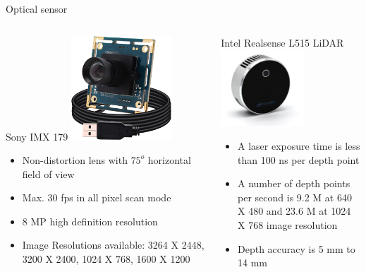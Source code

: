 \documentclass[10pt]{beamer}
\begin{document}
\begin{frame}{Optical sensor}
   \begin{columns}
      \begin{block}{Sony IMX 179}
         \centering
         \includegraphics[width=0.5\textwidth]{Images/imx179.png}
         
        \begin{itemize}
            \item Non-distortion lens with $75^o$ horizontal field of view
            \item Max. 30 fps in all pixel scan mode
            \item 8 MP high definition resolution 
            \item Image Resolutions available: 3264 X 2448, 3200 X 2400, 1024 X 768, 1600 X 1200
        \end{itemize}
      \end{block}
      
      \begin{block}{Intel Realsense L515 LiDAR}
         \centering
         \includegraphics[width=0.6\textwidth]{Images/L515.png}
        
        \begin{itemize}
             \item A laser exposure time is less than 100 ns per depth point
             \item A number of depth points per second is 9.2 M at 640 X 480 and 23.6 M at 1024 X 768 image resolution
             \item Depth accuracy is 5 mm to 14 mm
        \end{itemize}    
      \end{block}
   \end{columns}
\end{frame}
\end{document}
